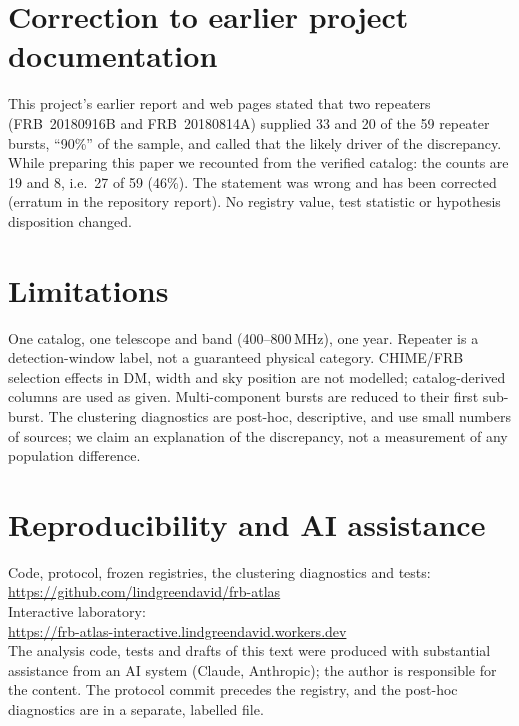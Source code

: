 \documentclass[11pt]{article}
\begin{document}
\section{Correction to earlier project documentation}
This project's earlier report and web pages stated that two repeaters (FRB~20180916B and FRB~20180814A) supplied 33 and 20 of
the 59 repeater bursts, ``90\%'' of the sample, and called that the likely driver of the discrepancy. While preparing this paper we
recounted from the verified catalog: the counts are 19 and 8, i.e.\ 27 of 59 (46\%). The statement was wrong and has been
corrected (erratum in the repository report). No registry value, test statistic or hypothesis disposition changed.

\section{Limitations}
One catalog, one telescope and band (400--800\,MHz), one year. Repeater is a detection-window label, not a guaranteed physical
category. CHIME/FRB selection effects in DM, width and sky position are not modelled; catalog-derived columns are used as given.
Multi-component bursts are reduced to their first sub-burst. The clustering diagnostics are post-hoc, descriptive, and use small
numbers of sources; we claim an explanation of the discrepancy, not a measurement of any population difference.

\section*{Reproducibility and AI assistance}
Code, protocol, frozen registries, the clustering diagnostics and tests:\\
\url{https://github.com/lindgreendavid/frb-atlas}\\
Interactive laboratory:\\
\url{https://frb-atlas-interactive.lindgreendavid.workers.dev}\\
The analysis code, tests and drafts of this text were produced with substantial assistance from an AI system (Claude, Anthropic);
the author is responsible for the content. The protocol commit precedes the registry, and the post-hoc diagnostics are in a separate,
labelled file.
\end{document}
